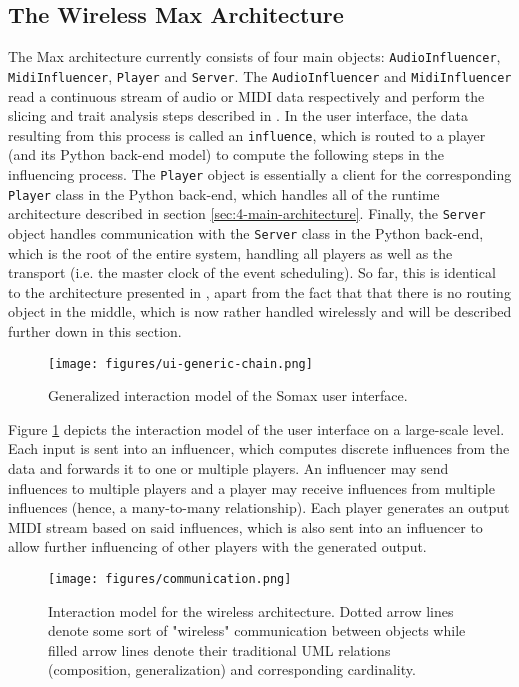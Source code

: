 \subsection{The Wireless Max Architecture}\label{ssec:max-architecture}
The Max architecture currently consists of four main objects: \texttt{Audio\-Influencer}, \texttt{MidiInfluencer}, \texttt{Player} and \texttt{Server}. The \texttt{AudioInfluencer} and \texttt{Midi\-Influencer} read a continuous stream of audio or MIDI data respectively and perform the slicing and trait analysis steps described in \cite{somaxtheory2021}. In the user interface, the data resulting from this process is called an \texttt{influence}, which is routed to a player (and its Python back-end model) to compute the following steps in the influencing process. The \texttt{Player} object is essentially a client for the corresponding \texttt{Player} class in the Python back-end, which handles all of the runtime architecture described in section \ref{sec:4-main-architecture}. Finally, the \texttt{Server} object handles communication with the \texttt{Server} class in the Python back-end, which is the root of the entire system, handling all players as well as the transport (i.e. the master clock of the event scheduling). So far, this is identical to the architecture presented in \cite{borg_2019}, apart from the fact that that there is no routing object in the middle, which is now rather handled wirelessly and will be described further down in this section.

 \begin{figure}[h!]
    \centering        
 	\texttt{[image: figures/ui-generic-chain.png]}
    \caption{Generalized interaction model of the Somax user interface.}
    \label{fig:somax-interaction}
\end{figure}


Figure \ref{fig:somax-interaction} depicts the interaction model of the user interface on a large-scale level. Each input is sent into an influencer, which computes discrete influences from the data and forwards it to one or multiple players. An influencer may send influences to multiple players and a player may receive influences from multiple influences (hence, a many-to-many relationship). Each player generates an output MIDI stream based on said influences, which is also sent into an influencer to allow further influencing of other players with the generated output. 

 \begin{figure}[h!]
    \centering        
 	\texttt{[image: figures/communication.png]}
    \caption{Interaction model for the wireless architecture. Dotted arrow lines denote some sort of "wireless" communication between objects while filled arrow lines denote their traditional UML relations (composition, generalization) and corresponding cardinality.}
    \label{fig:somax-communication}
\end{figure}

